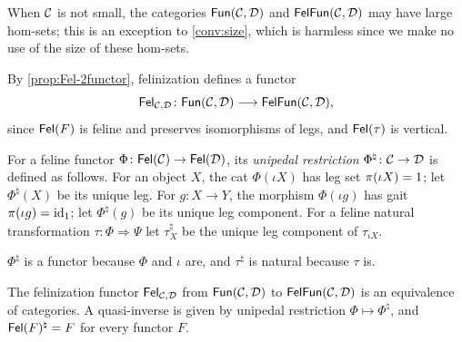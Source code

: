 When $\mathcal{C}$ is not small, the categories $\mathsf{Fun}(\mathcal{C},\mathcal{D})$ and $\mathsf{FelFun}(\mathcal{C},\mathcal{D})$
may have large hom-sets; this is an exception to \cref{conv:size}, which is
harmless since we make no use of the size of these hom-sets.

By \cref{prop:Fel-2functor}, felinization defines a functor
\[
\mathsf{Fel}_{\mathcal{C},\mathcal{D}}\colon\mathsf{Fun}(\mathcal{C},\mathcal{D})\longrightarrow\mathsf{FelFun}(\mathcal{C},\mathcal{D}),
\]
since $\mathsf{Fel}(F)$ is feline and preserves isomorphisms of legs, and $\mathsf{Fel}(\tau)$
is vertical.

\begin{definition}\label{def:restriction}
For a feline functor $\Phi\colon\mathsf{Fel}(\mathcal{C})\to\mathsf{Fel}(\mathcal{D})$, its \emph{unipedal
restriction} $\Phi^\natural\colon\mathcal{C}\to\mathcal{D}$ is defined as follows. For an
object $X$, the cat $\Phi(\iota X)$ has leg set $\pi(\iota X)=1$; let
$\Phi^\natural(X)$ be its unique leg. For $g\colon X\to Y$, the morphism
$\Phi(\iota g)$ has gait $\pi(\iota g)=\mathrm{id}_1$; let $\Phi^\natural(g)$ be its
unique leg component. For a feline natural transformation $\tau\colon\Phi\Rightarrow\Psi$
let $\tau^\natural_X$ be the unique leg component of $\tau_{\iota X}$.
\end{definition}

$\Phi^\natural$ is a functor because $\Phi$ and $\iota$ are, and $\tau^\natural$
is natural because $\tau$ is.

\begin{theorem}\label{thm:feline-functors}
The felinization functor $\mathsf{Fel}_{\mathcal{C},\mathcal{D}}$ from $\mathsf{Fun}(\mathcal{C},\mathcal{D})$ to
$\mathsf{FelFun}(\mathcal{C},\mathcal{D})$ is an equivalence of categories. A quasi-inverse is given by unipedal restriction
$\Phi\mapsto\Phi^\natural$, and $\mathsf{Fel}(F)^\natural=F$ for every functor $F$.
\end{theorem}


